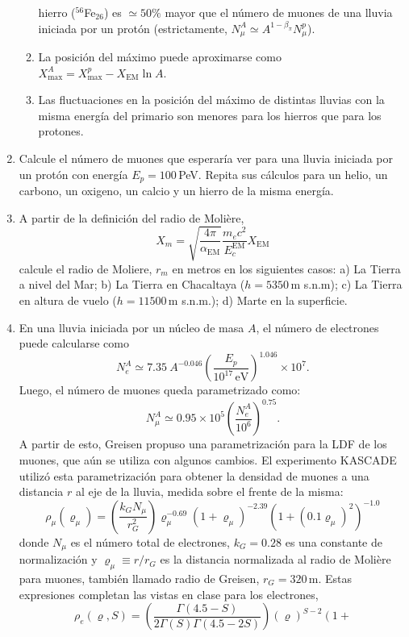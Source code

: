 \documentclass[11pt]{article}
\begin{document}
\begin{enumerate}
\begin{enumerate}
				hierro ($^{56}$Fe$_{26}$) es $\simeq 50\%$ mayor que el número de
				muones de una lluvia iniciada por un protón (estrictamente,
				$N_\mu^A \simeq A^{1-\beta_\pi} N_\mu^p$).
			\item La posición del máximo puede aproximarse como $X_{\max}^A =
				X_{\max}^{p} - X_{\mathrm{EM}} \ln A$.
			\item Las fluctuaciones en la posición del máximo de distintas
				lluvias con la misma energía del primario son menores para los
				hierros que para los protones. 
		\end{enumerate}
	\item Calcule el número de muones que esperaría ver para una lluvia
		iniciada por un protón con energía $E_p = 100$\,PeV. Repita sus
		cálculos para un helio, un carbono, un oxigeno, un calcio y un hierro
		de la misma energía.
	\item A partir de la definición del radio de Molière, 
		\[ X_m = \sqrt{\frac{4\pi}{\alpha_{\mathrm{EM}}}} \frac{m_e
		c^2}{E_{c}^{\mathrm{EM}}} X_{\mathrm{EM}}\]
		calcule el radio de Moliere, $r_m$ en metros en los siguientes casos:
		a) La Tierra a nivel del Mar; b) La Tierra en Chacaltaya ($h=5350$\,m
		s.n.m); c) La Tierra en altura de vuelo ($h=11500$\,m s.n.m.); d) Marte
		en la superficie.
	\item En una lluvia iniciada por un núcleo de masa $A$, el número de
		electrones puede calcularse como 
		\[N_e^A \simeq 7.35\ A^{-0.046} \left (
		\frac{E_p}{10^{17}\mathrm{\,eV}} \right )^{1.046} \times 10^7.\]
		Luego, el número de muones queda parametrizado como:
		\[N_\mu^A \simeq 0.95 \times 10^5  \left ( \frac{N_e^A}{10^6} \right
		)^{0.75}.\]
		A partir de esto, Greisen propuso una parametrización para la LDF de
		los muones, que aún se utiliza con algunos cambios. El experimento
		KASCADE utilizó esta parametrización para obtener la densidad de muones
		a una distancia $r$ al eje de la lluvia, medida sobre el frente de la
		misma:
		\[
			\rho_\mu(\varrho_\mu) = \left (\frac{k_G N_\mu}{r_G^2} \right )
			\varrho_\mu^{-0.69} \left ( 1 + \varrho_\mu \right
			)^{-2.39} \left ( 1 + \left (0.1 \varrho_\mu \right )^2 \right
			)^{-1.0}
		\]
		donde $N_\mu$ es el número total de electrones, $k_G=0.28$ es una
		constante de normalización y $\varrho_\mu\equiv r/r_G$ es la distancia
		normalizada al radio de Molière para muones, también llamado radio de
		Greisen, $r_G=320$\,m. Estas expresiones completan las vistas en
		clase para los electrones, 
		\[
			\rho_e(\varrho, S) = \left ( \frac{\Gamma(4.5 - S)}{2 \Gamma(S)
			\Gamma(4.5 - 2S)} \right ) \left( \varrho \right)^{S-2} \left(1 +
\]
\end{enumerate}
\end{document}
